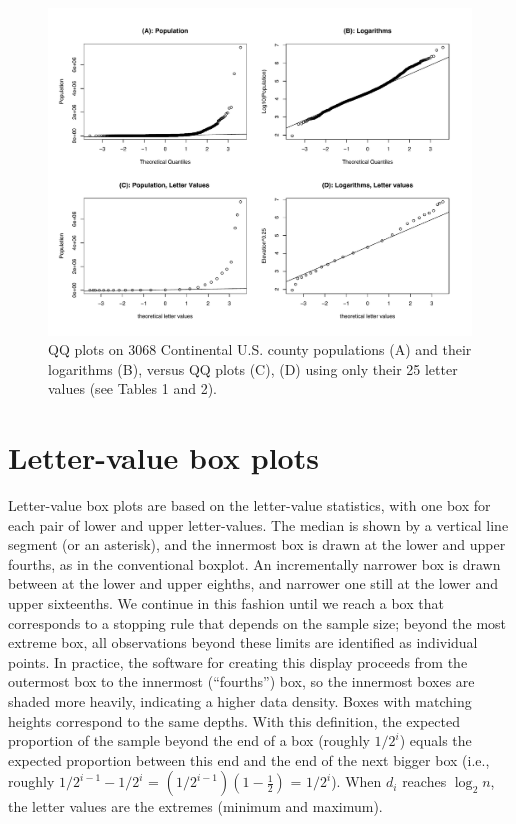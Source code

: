 \documentclass[oneside]{article}
\begin{document}
\begin{figure}[hbtp]
  \centering
  \includegraphics[scale=.5,angle=270]{qqpop4}

  \caption{QQ plots on 3068 Continental U.S. county populations (A) and their
  logarithms (B), versus QQ plots (C), (D) using only their 25 letter values
  (see Tables 1 and 2).}
  \label{qqpop4}
\end{figure}



\section{Letter-value box plots}

Letter-value box plots are based on the letter-value statistics,
with one box for each pair of lower and upper letter-values.
The median is shown by a vertical line segment (or an asterisk),
and the innermost box is drawn at the lower and upper fourths, 
as in the conventional boxplot.
An incrementally narrower box is drawn between at the lower
and upper eighths, and narrower one still at the lower
and upper sixteenths.
We continue in this fashion until we reach a box that corresponds 
to a stopping rule that depends on the sample size; beyond the 
most extreme box, all observations beyond these limits 
are identified as individual points.
In practice, the software for creating this display
proceeds from the outermost box to the innermost (``fourths'')
box, so the innermost boxes are shaded more heavily,
indicating a higher data density.
Boxes with matching heights correspond to the same depths.
With this definition, the expected proportion of the 
sample beyond the end of a box (roughly $1/2^i$)
equals the expected proportion between this end 
and the end of the next bigger box
(i.e., roughly $1/2^{i-1} - 1/2^i$ = $(1/2^{i-1})(1 - \frac{1}{2})$
= $1 / 2^i$).
When $d_i$ reaches $\log_2 n$, the letter values are the extremes
(minimum and maximum).
\end{document}
